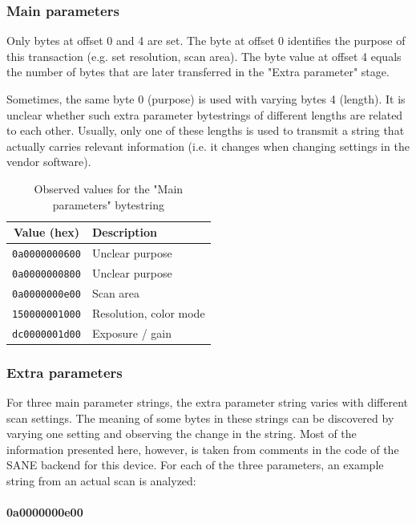 \documentclass{article}
\begin{document}
\subsubsection{Main parameters}
\label{ssec:param_param}

Only bytes at offset 0 and 4 are set. The byte at offset 0 identifies the
purpose of this transaction (e.g. set resolution, scan area). The byte value at offset 4 equals
the number of bytes that are later transferred in the "Extra parameter"
stage.

Sometimes, the same byte 0 (purpose) is used with varying bytes 4 (length).
It is unclear whether such extra parameter bytestrings of different lengths
are related to each other. Usually, only one of these lengths is used to transmit
a string that actually carries relevant information (i.e. it changes when
changing settings in the vendor software).

\begin{table}[H]
  \caption{Observed values for the "Main parameters" bytestring}
  \centering
  \begin{tabular}{c | p{7cm}}
    Value (hex) & Description \\ \hline
    {\tt 0a0000000600} & Unclear purpose \\
    {\tt 0a0000000800} & Unclear purpose \\
    {\tt 0a0000000e00} & Scan area \\
    {\tt 150000001000} & Resolution, color mode \\
    {\tt dc0000001d00} & Exposure / gain \\
  \end{tabular}
\end{table}

\subsubsection{Extra parameters}
\label{ssec:param_extra}

For three main parameter strings, the extra parameter string varies
with different scan settings. The meaning of some bytes in these strings
can be discovered by varying one setting and observing the change in the
string. Most of the information presented here, however,
is taken from comments in the code of the SANE backend for this device.
For each of the three parameters, an example string from an actual
scan is analyzed:

\paragraph{0a0000000e00}
\end{document}
